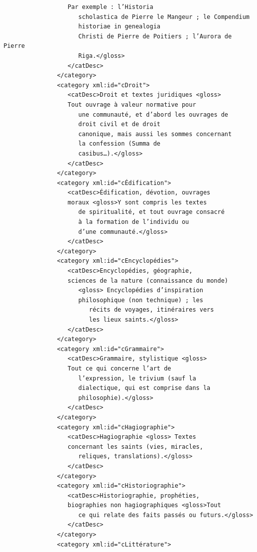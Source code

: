 \documentclass[a4paper,12pt,twoside]{book}
\begin{document}
\begin{verbatim}
                  Par exemple : l’Historia
                     scholastica de Pierre le Mangeur ; le Compendium 
                     historiae in genealogia
                     Christi de Pierre de Poitiers ; l’Aurora de Pierre 
                     Riga.</gloss>
                  </catDesc>
               </category>
               <category xml:id="cDroit">
                  <catDesc>Droit et textes juridiques <gloss> 
                  Tout ouvrage à valeur normative pour
                     une communauté, et d’abord les ouvrages de 
                     droit civil et de droit
                     canonique, mais aussi les sommes concernant
                     la confession (Summa de
                     casibus…).</gloss>
                  </catDesc>
               </category>
               <category xml:id="cÉdification">
                  <catDesc>Édification, dévotion, ouvrages 
                  moraux <gloss>Y sont compris les textes
                     de spiritualité, et tout ouvrage consacré 
                     à la formation de l’individu ou
                     d’une communauté.</gloss>
                  </catDesc>
               </category>
               <category xml:id="cEncyclopédies">
                  <catDesc>Encyclopédies, géographie, 
                  sciences de la nature (connaissance du monde)
                     <gloss> Encyclopédies d’inspiration 
                     philosophique (non technique) ; les
                        récits de voyages, itinéraires vers 
                        les lieux saints.</gloss>
                  </catDesc>
               </category>
               <category xml:id="cGrammaire">
                  <catDesc>Grammaire, stylistique <gloss> 
                  Tout ce qui concerne l’art de
                     l’expression, le trivium (sauf la
                     dialectique, qui est comprise dans la
                     philosophie).</gloss>
                  </catDesc>
               </category>
               <category xml:id="cHagiographie">
                  <catDesc>Hagiographie <gloss> Textes 
                  concernant les saints (vies, miracles,
                     reliques, translations).</gloss>
                  </catDesc>
               </category>
               <category xml:id="cHistoriographie">
                  <catDesc>Historiographie, prophéties, 
                  biographies non hagiographiques <gloss>Tout
                     ce qui relate des faits passés ou futurs.</gloss>
                  </catDesc>
               </category>
               <category xml:id="cLittérature">

\end{verbatim}
\end{document}
